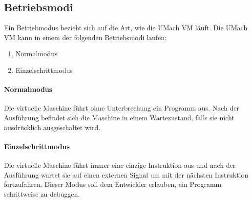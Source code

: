 \subsection{Betriebsmodi}
Ein Betriebmodus bezieht sich auf die Art, wie die UMach VM läuft.
Die UMach VM kann in einem der folgenden Betriebsmodi laufen:

\begin{enumerate}
  \item Normalmodus
  \item Einzelschrittmodus
\end{enumerate}

\paragraph{Normalmodus} Die virtuelle Maschine führt ohne Unterbrechung ein
Programm aus. Nach der Ausführung befindet sich die Maschine in einem
Wartezustand, falls sie nicht ausdrücklich ausgeschaltet wird.

\paragraph{Einzelschrittmodus} Die virtuelle Maschine führt immer eine einzige
Instruktion aus und nach der Ausführung wartet sie auf einen externen Signal um
mit der nächsten Instruktion fortzufahren. Dieser Modus soll dem Entwickler
erlauben, ein Programm schrittweise zu debuggen.


